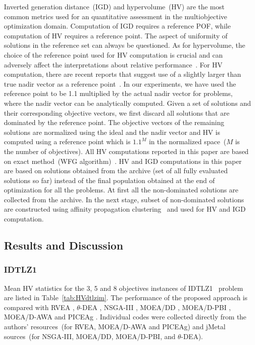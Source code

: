 \documentclass{sig-alternate}
\begin{document}
 Inverted generation distance~(IGD) and hypervolume~(HV) are the most common metrics used for an quantitative assessment in the multiobjective optimization domain. Computation of IGD requires a reference POF, while computation of HV requires a reference point. The aspect of uniformity of solutions in the reference set can always be questioned. As for hypervolume, the choice of the reference point used for HV computation is crucial and can adversely affect the interpretations about relative performance~\cite{Yuan2016many,ishibuchi2010many}. For HV computation, there are recent reports that suggest use of a slightly larger than true nadir vector as a reference point~\cite{Yuan2016many,ishibuchi2010many}. In our experiments, we have used the reference point to be 1.1 multiplied by the actual nadir vector for problems, where the nadir vector can be analytically computed. Given a set of solutions and their corresponding objective vectors, we first discard all solutions that are dominated by the reference point. The objective vectors of the remaining solutions are normalized using the ideal and the nadir vector and HV is computed using a reference point which is $1.1^M$ in the normalized space~($M$ is the number of objectives). All HV computations reported in this paper are based on exact method~(WFG algorithm)~\cite{while2012hv}. HV and IGD computations in this paper are based on solutions obtained from the archive (set of all fully evaluated solutions so far) instead of the final population obtained at the end of optimization for all the problems. At first all the non-dominated solutions are collected from the archive. In the next stage, subset of non-dominated solutions are constructed using affinity propagation clustering~\cite{apcluster2011} and used for HV and IGD computation. 

\subsection{Results and Discussion}
\label{sec:resdis}
\subsubsection{IDTLZ1}
Mean HV statistics for the 3, 5 and 8 objectives instances of IDTLZ1~\cite{Deb2014adaptive} problem are listed in Table~\ref{tab:HVdtlzim}. The performance of the proposed approach is compared with RVEA \cite{Cheng2016many}, $\theta$-DEA \cite{Yuan2016many}, NSGA-III \cite{Deb2014box}, MOEA/DD \cite{Li2015dominance}, MOEA/D-PBI \cite{zhang2007moead}, MOEA/D-AWA \cite{Qi2014adaptive} and PICEAg \cite{wangpicea2013}. Individual codes were collected directly from the authors' resources~(for RVEA, MOEA/D-AWA and PICEAg) and jMetal~\cite{durillo2011jmetal} sources~(for NSGA-III, MOEA/DD, MOEA/D-PBI, and $\theta$-DEA). 
 
\end{document}
